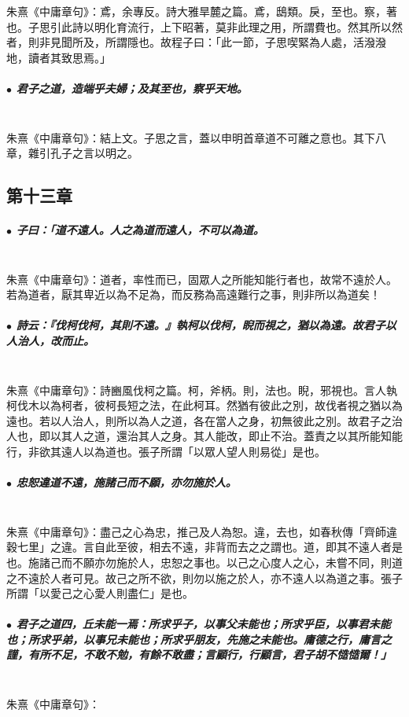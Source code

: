\documentclass[hyperref, UTF8, 12pt, a4paper]{ctexrep}
\begin{document}
朱熹《中庸章句》：鳶，余專反。詩大雅旱麓之篇。鳶，鴟類。戾，至也。察，著也。子思引此詩以明化育流行，上下昭著，莫非此理之用，所謂費也。然其所以然者，則非見聞所及，所謂隱也。故程子曰：「此一節，子思喫緊為人處，活潑潑地，讀者其致思焉。」

\subparagraph{$\bullet$ 君子之道，造端乎夫婦；及其至也，察乎天地。} ~\\

朱熹《中庸章句》：結上文。子思之言，蓋以申明首章道不可離之意也。其下八章，雜引孔子之言以明之。

\newpage
\subsection{第十三章}

\subparagraph{$\bullet$ 子曰：「道不遠人。人之為道而遠人，不可以為道。} ~\\

朱熹《中庸章句》：道者，率性而已，固眾人之所能知能行者也，故常不遠於人。若為道者，厭其卑近以為不足為，而反務為高遠難行之事，則非所以為道矣！

\subparagraph{$\bullet$ 詩云：『伐柯伐柯，其則不遠。』執柯以伐柯，睨而視之，猶以為遠。故君子以人治人，改而止。} ~\\

朱熹《中庸章句》：詩豳風伐柯之篇。柯，斧柄。則，法也。睨，邪視也。言人執柯伐木以為柯者，彼柯長短之法，在此柯耳。然猶有彼此之別，故伐者視之猶以為遠也。若以人治人，則所以為人之道，各在當人之身，初無彼此之別。故君子之治人也，即以其人之道，還治其人之身。其人能改，即止不治。蓋責之以其所能知能行，非欲其遠人以為道也。張子所謂「以眾人望人則易從」是也。

\subparagraph{$\bullet$ 忠恕違道不遠，施諸己而不願，亦勿施於人。} ~\\

朱熹《中庸章句》：盡己之心為忠，推己及人為恕。違，去也，如春秋傳「齊師違穀七里」之違。言自此至彼，相去不遠，非背而去之之謂也。道，即其不遠人者是也。施諸己而不願亦勿施於人，忠恕之事也。以己之心度人之心，未嘗不同，則道之不遠於人者可見。故己之所不欲，則勿以施之於人，亦不遠人以為道之事。張子所謂「以愛己之心愛人則盡仁」是也。

\subparagraph{$\bullet$ 君子之道四，丘未能一焉：所求乎子，以事父未能也；所求乎臣，以事君未能也；所求乎弟，以事兄未能也；所求乎朋友，先施之未能也。庸德之行，庸言之謹，有所不足，不敢不勉，有餘不敢盡；言顧行，行顧言，君子胡不慥慥爾！」} ~\\

朱熹《中庸章句》：
\end{document}
